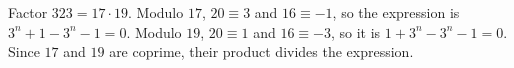 Factor $323=17\cdot19$. Modulo $17$, $20\equiv3$ and $16\equiv-1$, so the expression is $3^n+1-3^n-1=0$. Modulo $19$, $20\equiv1$ and $16\equiv-3$, so it is $1+3^n-3^n-1=0$. Since $17$ and $19$ are coprime, their product divides the expression.
